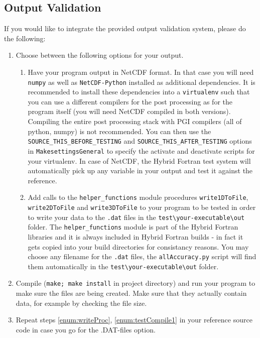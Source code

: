 \subsection{Output Validation} \label{sub:testIntegration}
If you would like to integrate the provided output validation system, please do the following:
\begin{enumerate}
  \item \label{enum:writeProc} Choose between the following options for your output.
    \begin{enumerate}
      \item Have your program output in NetCDF format. In that case you will need \verb|numpy| as well as \verb|NetCDF-Python| installed as additional dependencies. It is recommended to install these dependencies into a \verb|virtualenv| such that you can use a different compilers for the post processing as for the program itself (you will need NetCDF compiled in both versions). Compiling the entire post processing stack with PGI compilers (all of python, numpy) is not recommended. You can then use the \verb|SOURCE_THIS_BEFORE_TESTING| and \verb|SOURCE_THIS_AFTER_TESTING| options in \verb|MakesettingsGeneral| to specify the activate and deactivate scripts for your virtualenv. In case of NetCDF, the Hybrid Fortran test system will automatically pick up any variable in your output and test it against the reference.
      \item Add calls to the \verb|helper_functions| module procedures \verb|write1DToFile|, \verb|write2DToFile| and \verb|write3DToFile| to your program to be tested in order to write your data to the \verb|.dat| files in the \verb|test\your-executable\out| folder. The \verb|helper_functions| module is part of the Hybrid Fortran libraries and it is always included in Hybrid Fortran builds - in fact it gets copied into your build directories for consistancy reasons. You may choose any filename for the \verb|.dat| files, the \verb|allAccuracy.py| script will find them automatically in the \verb|test\your-executable\out| folder.
    \end{enumerate}
  \item \label{enum:testCompile1} Compile (\verb|make; make install| in project directory) and run your program to make sure the files are being created. Make sure that they actually contain data, for example by checking the file size.
  \item Repeat steps \ref{enum:writeProc}, \ref{enum:testCompile1} in your reference source code in case you go for the .DAT-files option.

\end{enumerate}
